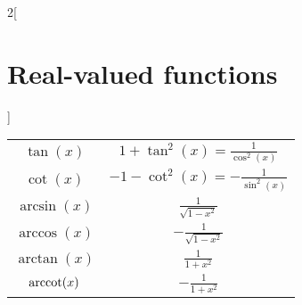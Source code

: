 \documentclass[../../../main.tex]{subfiles}
\begin{document}
\begin{multicols}{2}[\section{Real-valued functions}]
\begin{center}
\begin{tabular}{|c|c|}
      $\tan(x)$    & $\displaystyle 1+\tan^2(x)=\frac{1}{\cos^2(x)}$   \\
      $\cot(x)$    & $\displaystyle -1-\cot^2(x)=-\frac{1}{\sin^2(x)}$ \\
      $\arcsin(x)$ & $\displaystyle \frac{1}{\sqrt{1-x^2}}$            \\
      $\arccos(x)$ & $\displaystyle -\frac{1}{\sqrt{1-x^2}}$           \\
      $\arctan(x)$ & $\displaystyle \frac{1}{1+x^2}$                   \\
      $\arccot(x)$ & $\displaystyle -\frac{1}{1+x^2}$                  \\
      \hline
    \end{tabular}
  \end{center}

\end{multicols}
\end{document}
